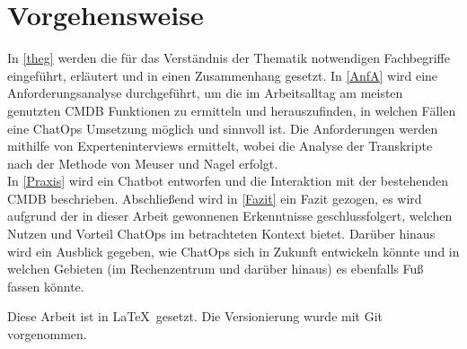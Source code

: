 \section{Vorgehensweise}
In \autoref{theg} werden die für das Verständnis der Thematik notwendigen Fachbegriffe eingeführt, erläutert und in einen Zusammenhang gesetzt. In \autoref{AnfA} wird eine Anforderungsanalyse durchgeführt, um die im Arbeitsalltag am meisten genutzten \acs{CMDB} Funktionen zu ermitteln und herauszufinden, in welchen Fällen eine ChatOps Umsetzung möglich und sinnvoll ist. Die Anforderungen werden mithilfe von Experteninterviews ermittelt, wobei die Analyse der Transkripte nach der Methode von Meuser und Nagel erfolgt.\\
In \autoref{Praxis} wird ein Chatbot entworfen und die Interaktion mit der bestehenden \acs{CMDB} beschrieben.
Abschließend wird in \autoref{Fazit} ein Fazit gezogen, es wird aufgrund der in dieser Arbeit gewonnenen Erkenntnisse geschlussfolgert, welchen Nutzen und Vorteil ChatOps im betrachteten Kontext bietet. Darüber hinaus wird ein Ausblick gegeben, wie ChatOps sich in Zukunft entwickeln könnte und in welchen Gebieten (im Rechenzentrum und darüber hinaus) es ebenfalls Fuß fassen könnte.

Diese Arbeit ist in \LaTeX~gesetzt. Die Versionierung wurde mit Git vorgenommen.
